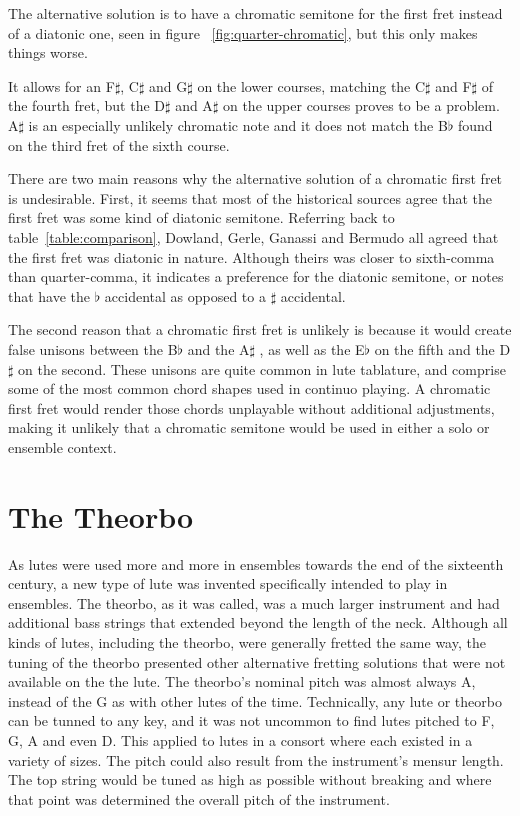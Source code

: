 The alternative solution is to have a chromatic semitone for the first fret instead of a
diatonic one, seen in figure ~\ref{fig:quarter-chromatic}, but this only makes things
worse.

It allows for an F$\sharp$, C$\sharp$ and G$\sharp$ on the lower courses, matching the
C$\sharp$ and F$\sharp$ of the fourth fret, but the D$\sharp$ and A$\sharp$ on the
upper courses proves to be a problem. A$\sharp$ is an especially unlikely chromatic
note and it does not match the B$\flat$ found on the third fret of the sixth course.

There are two main reasons why the alternative solution of a chromatic first fret is
undesirable. First, it seems that most of the historical sources agree that the first
fret was some kind of diatonic semitone.  Referring back to
table~\ref{table:comparison}, Dowland, Gerle, Ganassi and Bermudo all agreed that the
first fret was diatonic in nature. Although theirs was closer to sixth-comma than
quarter-comma, it indicates a preference for the diatonic semitone, or notes that have
the $\flat$ accidental as opposed to a $\sharp$ accidental.

The second reason that a chromatic first fret is unlikely is because it would create
false unisons between the B$\flat$ and the A$\sharp$ , as well as the E$\flat$ on the
fifth and the D$\sharp$ on the second. These unisons are quite common in lute
tablature, and comprise some of the most common chord shapes used in continuo playing.
A chromatic first fret would render those chords unplayable without additional
adjustments, making it unlikely that a chromatic semitone would be used in either a
solo or ensemble context.

\section{The Theorbo}

As lutes were used more and more in ensembles towards the end of the sixteenth century, a
new type of lute was invented specifically intended to play in ensembles.  The theorbo, as
it was called, was a much larger instrument and had additional bass strings that extended
beyond the length of the neck.  Although all kinds of lutes, including the theorbo, were
generally fretted the same way, the tuning of the theorbo presented other alternative
fretting solutions that were not available on the the lute.  The theorbo's nominal pitch
was almost always A, instead of the G as with other lutes of the time.  Technically, any
lute or theorbo can be tunned to any key, and it was not uncommon to find lutes pitched to
F, G, A and even D.  This applied to lutes in a consort where each existed in a variety of
sizes.  The pitch could also result from the instrument's mensur length.  The top string
would be tuned as high as possible without breaking and where that point was determined
the overall pitch of the instrument.

